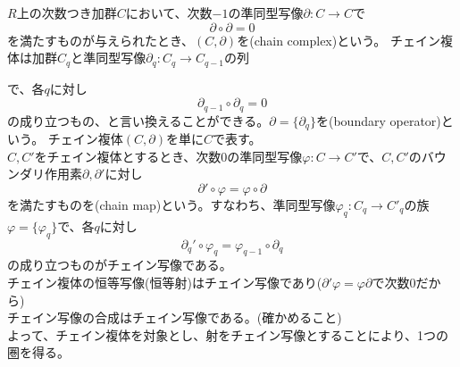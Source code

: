 \documentclass[dvipdfmx,a4paper,11pt]{jsarticle}
\begin{document}
\begin{tcolorbox}[title = 例3]
  $R$上の次数つき加群$C$において、次数$-1$の準同型写像$\partial : C\to C$で
  \begin{equation*}
    \partial \circ \partial = 0
  \end{equation*}
  を満たすものが与えられたとき、$(C,\partial)$を(chain complex)という。
  チェイン複体は加群$C_{q}$と準同型写像$\partial_{q}:C_{q}\to C_{q-1}$の列
  \begin{center}
  \end{center}
  で、各$q$に対し
  \begin{equation*}
    \partial_{q-1} \circ \partial_{q} = 0
  \end{equation*}
  の成り立つもの、と言い換えることができる。$\partial = \{\partial_{q}\}$を(boundary operator)という。
  チェイン複体$(C,\partial)$を単に$C$で表す。\\
  $C,C'$をチェイン複体とするとき、次数$0$の準同型写像$\varphi : C\to C'$で、$C,C'$のバウンダリ作用素$\partial,\partial'$に対し
  \begin{equation*}
    \partial' \circ \varphi = \varphi \circ \partial
  \end{equation*}
  を満たすものを(chain map)という。すなわち、準同型写像$\varphi_{q} : C_{q} \to C'_{q}$の族
  $\varphi = \{\varphi_{q}\}$で、各$q$に対し
  \begin{equation*}
    \partial_{q}' \circ \varphi_{q} = \varphi_{q-1} \circ \partial_{q}
  \end{equation*}
  の成り立つものがチェイン写像である。\\
  チェイン複体の恒等写像(恒等射)はチェイン写像であり($\partial'\varphi = \varphi\partial$で次数$0$だから)\\
  チェイン写像の合成はチェイン写像である。(確かめること)\\
  よって、チェイン複体を対象とし、射をチェイン写像とすることにより、1つの圏を得る。
\end{tcolorbox}
\end{document}
